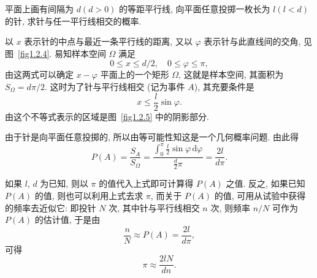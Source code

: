 \begin{example}[蒲丰投针问题]
    平面上画有间隔为 $d (d > 0)$ 的等距平行线,
    向平面任意投掷一枚长为 $l (l<d)$ 的针,
    求针与任一平行线相交的概率.
\end{example}
\begin{solution}
    以 $x$ 表示针的中点与最近一条平行线的距离,
    又以 $\varphi$ 表示针与此直线间的交角,
    见图~\ref{fig1.2.4}.
    易知样本空间 $\Omega$ 满足
    \[
        0 \le x \le d/2, \quad 0 \le \varphi \le \pi,
    \]
    由这两式可以确定 $x - \varphi$ 平面上的一个矩形 $\Omega$,
    这就是样本空间,
    其面积为 $S_\Omega = d\pi/2$.
    这时为了针与平行线相交 (记为事件 $A$),
    其充要条件是
    \[
        x \le \frac{l}{2} \sin \varphi.
    \]
    由这个不等式表示的区域是图~\ref{fig1.2.5} 中的阴影部分.

    由于针是向平面任意投掷的,
    所以由等可能性知这是一个几何概率问题.
    由此得
    \[
        P (A) = \frac{S_A}{S_\Omega}
        = \frac{\int_0^\pi \frac{l}{2} \sin \varphi \, \mathrm{d} \varphi}{\frac{d}{2} \pi}
        = \frac{2l}{d\pi}.
    \]

    如果 $l$, $d$ 为已知,
    则以 $\pi$ 的值代入上式即可计算得 $P(A)$ 之值.
    反之,
    如果已知 $P(A)$ 的值,
    则也可以利用上式去求 $\pi$,
    而关于 $P(A)$ 的值,
    可用从试验中获得的频率去近似它:
    即投针 $N$ 次,
    其中针与平行线相交 $n$ 次,
    则频率 $n/N$ 可作为 $P(A)$ 的估计值,
    于是由
    \[
        \frac{n}{N} \approx P (A) = \frac{2l}{d\pi},
    \]
    可得
    \[
        \pi \approx \frac{2lN}{dn}.
    \]
\end{solution}

